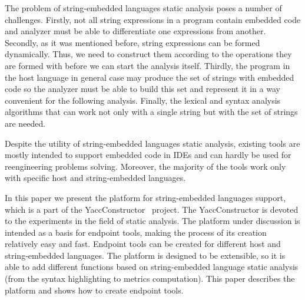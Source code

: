 \documentclass{sig-alternate-05-2015}
\begin{document}
The problem of string-embedded languages static analysis poses a number of challenges. Firstly, not all string expressions in a program contain embedded code and analyzer must be able to differentiate one expressions from another. Secondly, as it was mentioned before, string expressions can be formed dynamically. Thus, we need to construct them according to the operations they are formed with before we can start the analysis itself. Thirdly, the program in the host language in general case may produce the set of strings with embedded code so the analyzer must be able to build this set and represent it in a way convenient for the following analysis. Finally, the lexical and syntax analysis algorithms that can work not only with a single string but with the set of strings are needed.

Despite the utility of string-embedded languages static analysis, existing tools are mostly intended to support embedded code in IDEs and can hardly be used for reengineering problems solving. Moreover, the majority of the tools work only with specific host and string-embedded languages.

In this paper we present the platform for string-embedded languages support, which is a part of the  YaccConstructor~\cite{YaccConstructor:ref} project. The YaccConstructor is devoted to the experiments in the field of static analysis. The platform under discussion is intended as a basis for endpoint tools, making the process of its creation relatively easy and fast. Endpoint tools can be created for different host and string-embedded languages. The platform is designed to be extensible, so it is able to add different functions based on string-embedded language static analysis (from the syntax highlighting to metrics computation). This paper describes the platform and shows how to create endpoint tools.





\balancecolumns
\end{document}
